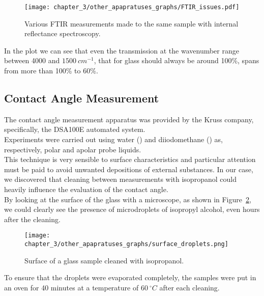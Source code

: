 \begin{figure}[H]
    \centering
    \texttt{[image: chapter\_3/other\_apapratuses\_graphs/FTIR\_issues.pdf]} 
    \vspace*{-30pt}
    \caption{Various FTIR measurements made to the same sample with internal reflectance spectroscopy.}
    \label{fig:ftir_issues}
\end{figure}

In the plot we can see that even the transmission at the wavenumber range between 4000 and $1500\: cm^{-1}$, that for glass should always be around 100\%, spans from more than 100\% to 60\%.

\subsection{Contact Angle Measurement}
\label{subsec:contact_angle_setup}
The contact angle measurement apparatus was provided by the Kruss company, specifically, the DSA100E automated system.
\\
Experiments were carried out using water () and diiodomethane () as, respectively, polar and apolar probe liquids.
\\
This technique is very sensible to surface characteristics and particular attention must be paid to avoid unwanted depositions of external substances. In our case, we discovered that cleaning between measurements with isopropanol could heavily influence the evaluation of the contact angle.  
\\ 
By looking at the surface of the glass with a microscope, as shown in Figure~\ref{fig:surface_droplets}, we could clearly see the presence of microdroplets of isopropyl alcohol, even hours after the cleaning. 

\begin{figure}[H]
    \centering
    \texttt{[image: chapter\_3/other\_apapratuses\_graphs/surface\_droplets.png]} 
    \caption{Surface of a glass sample cleaned with isopropanol.}
    \label{fig:surface_droplets}
\end{figure}

To ensure that the droplets were evaporated completely, the samples were put in an oven for 40 minutes at a temperature of $60\: ^{\circ} C$ after each cleaning.


